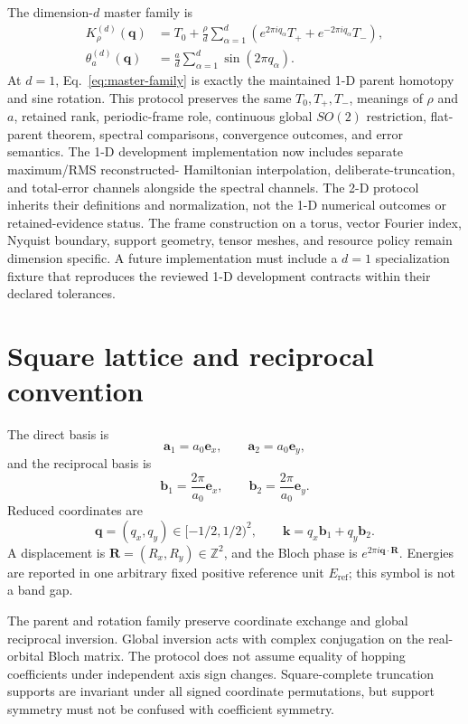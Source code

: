 \documentclass[11pt]{article}
\newcommand{\Z}{\mathbb Z}
\begin{document}
The dimension-$d$ master family is
\begin{align}
 K_\rho^{(d)}(\mathbf q)
 &=T_0+\frac\rho d\sum_{\alpha=1}^{d}
 \left(e^{2\pi iq_\alpha}T_+ +e^{-2\pi iq_\alpha}T_-\right),\\
 \theta_a^{(d)}(\mathbf q)
 &=\frac a d\sum_{\alpha=1}^{d}\sin(2\pi q_\alpha).
 \label{eq:master-family}
\end{align}
At $d=1$, Eq.~\eqref{eq:master-family} is exactly the maintained 1-D parent homotopy
and sine rotation. This protocol preserves the same $T_0,T_+,T_-$, meanings of $\rho$
and $a$, retained rank, periodic-frame role, continuous global $SO(2)$ restriction,
flat-parent theorem, spectral comparisons, convergence outcomes, and error semantics.
The 1-D development implementation now includes separate maximum/RMS reconstructed-
Hamiltonian interpolation, deliberate-truncation, and total-error channels alongside the
spectral channels. The 2-D protocol inherits their definitions and normalization, not the
1-D numerical outcomes or retained-evidence status. The frame construction on a torus,
vector Fourier index, Nyquist boundary, support geometry, tensor meshes, and resource
policy remain dimension specific. A future implementation must include a $d=1$
specialization fixture that reproduces the reviewed 1-D development contracts within
their declared tolerances.

\section{Square lattice and reciprocal convention}

The direct basis is
\begin{equation}
 \mathbf a_1=a_0\mathbf e_x,
 \qquad
 \mathbf a_2=a_0\mathbf e_y,
\end{equation}
and the reciprocal basis is
\begin{equation}
 \mathbf b_1=\frac{2\pi}{a_0}\mathbf e_x,
 \qquad
 \mathbf b_2=\frac{2\pi}{a_0}\mathbf e_y.
\end{equation}
Reduced coordinates are
\begin{equation}
 \mathbf q=(q_x,q_y)\in[-1/2,1/2)^2,
 \qquad
 \mathbf k=q_x\mathbf b_1+q_y\mathbf b_2.
\end{equation}
A displacement is $\mathbf R=(R_x,R_y)\in\Z^2$, and the Bloch phase is
$e^{2\pi i\mathbf q\cdot\mathbf R}$. Energies are reported in one arbitrary fixed
positive reference unit $E_{\mathrm{ref}}$; this symbol is not a band gap.

The parent and rotation family preserve coordinate exchange and global reciprocal
inversion. Global inversion acts with complex conjugation on the real-orbital Bloch
matrix. The protocol does not assume equality of hopping coefficients under independent
axis sign changes. Square-complete truncation supports are invariant under all signed
coordinate permutations, but support symmetry must not be confused with coefficient
symmetry.
\end{document}

